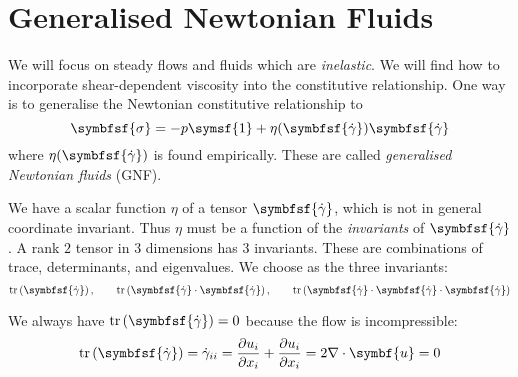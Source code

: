\documentclass{jknotes}
\begin{document}
\begin{center}
\end{center}

\section{Generalised Newtonian Fluids}

We will focus on steady flows and fluids which are \emph{inelastic}. We will
find how to incorporate shear-dependent viscosity into the constitutive
relationship. One way is to generalise the Newtonian constitutive
relationship to
\begin{equation}
	\symbfsf{\sigma} = -p \symsf{1} +
	\eta(\symbfsf{\srate})\symbfsf{\srate}
\end{equation}
where $\eta(\symbfsf{\srate})$ is found empirically. These are called
\emph{generalised Newtonian fluids} (GNF).

We have a scalar function $\eta$ of a tensor $\symbfsf{\srate}$, which is
not in general coordinate invariant. Thus $\eta$ must be a function of the
\emph{invariants} of $\symbfsf{\srate}$. A rank $2$ tensor in $3$
dimensions has $3$ invariants. These are combinations of trace, determinants,
and eigenvalues. We choose as the three invariants:
\begin{equation}
	\trace{\symbfsf{\srate}}, \hspace{2em} \trace{\symbfsf{\srate} \cdot
	\symbfsf{\srate}}, \hspace{2em} \trace{\symbfsf{\srate} \cdot
\symbfsf{\srate} \cdot \symbfsf{\srate}}
\end{equation}

We always have $\trace{\symbfsf{\srate}} = 0$ because the flow is incompressible:
\begin{equation}
	\trace{\symbfsf{\srate}} = \srate_{ii} = \frac{\partial u_i}{\partial x_i} +
	\frac{\partial u_i}{\partial x_i} = 2\nabla \cdot \symbf{u} = 0
\end{equation}
\end{document}
